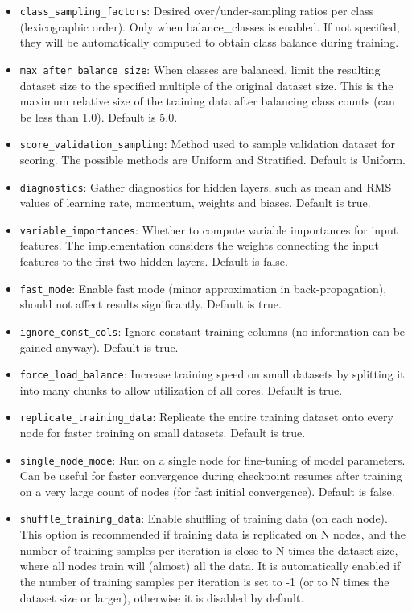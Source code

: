 \documentclass[11pt]{article}
\begin{document}
\begin{itemize}
\item \texttt{class\_sampling\_factors}: Desired over/under-sampling ratios per class (lexicographic order). Only when balance\_classes is enabled. If not specified, they will be automatically computed to obtain class balance during training.
\item \texttt{max\_after\_balance\_size}: When classes are balanced, limit the resulting dataset size to the specified multiple of the original dataset size. This is the maximum relative size of the training data after balancing class counts (can be less than 1.0). Default is 5.0.
\item \texttt{score\_validation\_sampling}: Method used to sample validation dataset for scoring. The possible methods are Uniform and Stratified. Default is Uniform.
\item \texttt{diagnostics}: Gather diagnostics for hidden layers, such as mean and RMS values of learning rate, momentum, weights and biases. Default is true.
\item \texttt{variable\_importances}: Whether to compute variable importances for input features. The implementation considers the weights connecting the input features to the first two hidden layers. Default is false.
\item \texttt{fast\_mode}: Enable fast mode (minor approximation in back-propagation), should not affect results significantly. Default is true.
\item \texttt{ignore\_const\_cols}: Ignore constant training columns (no information can be gained anyway). Default is true.
\item \texttt{force\_load\_balance}:  Increase training speed on small datasets by splitting it into many chunks to allow utilization of all cores. Default is true.
\item \texttt{replicate\_training\_data}:  Replicate the entire training dataset onto every node for faster training on small datasets. Default is true.
\item \texttt{single\_node\_mode}:  Run on a single node for fine-tuning of model parameters. Can be useful for faster convergence during checkpoint resumes after training on a very large count of nodes (for fast initial convergence). Default is false.
\item \texttt{shuffle\_training\_data}: Enable shuffling of training data (on each node). This option is recommended if training data is replicated on N nodes, and the number of training samples per iteration is close to N times the dataset size, where all nodes train will (almost) all the data. It is automatically enabled if the number of training samples per iteration is set to -1 (or to N times the dataset size or larger), otherwise it is disabled by default.
\end{itemize}
\end{document}
